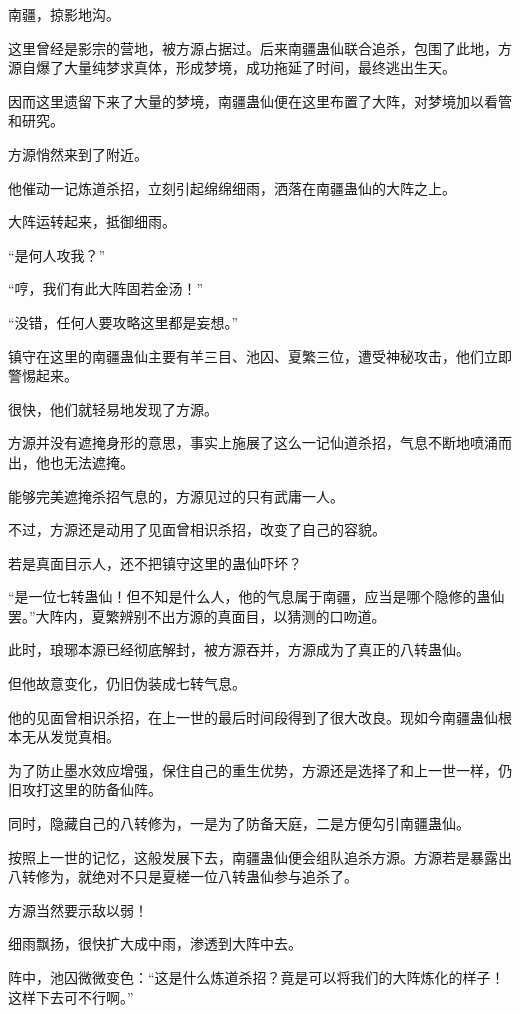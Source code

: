 \begin{this_body}
南疆，掠影地沟。

这里曾经是影宗的营地，被方源占据过。后来南疆蛊仙联合追杀，包围了此地，方源自爆了大量纯梦求真体，形成梦境，成功拖延了时间，最终逃出生天。

因而这里遗留下来了大量的梦境，南疆蛊仙便在这里布置了大阵，对梦境加以看管和研究。

方源悄然来到了附近。

他催动一记炼道杀招，立刻引起绵绵细雨，洒落在南疆蛊仙的大阵之上。

大阵运转起来，抵御细雨。

“是何人攻我？”

“哼，我们有此大阵固若金汤！”

“没错，任何人要攻略这里都是妄想。”

镇守在这里的南疆蛊仙主要有羊三目、池囚、夏繁三位，遭受神秘攻击，他们立即警惕起来。

很快，他们就轻易地发现了方源。

方源并没有遮掩身形的意思，事实上施展了这么一记仙道杀招，气息不断地喷涌而出，他也无法遮掩。

能够完美遮掩杀招气息的，方源见过的只有武庸一人。

不过，方源还是动用了见面曾相识杀招，改变了自己的容貌。

若是真面目示人，还不把镇守这里的蛊仙吓坏？

“是一位七转蛊仙！但不知是什么人，他的气息属于南疆，应当是哪个隐修的蛊仙罢。”大阵内，夏繁辨别不出方源的真面目，以猜测的口吻道。

此时，琅琊本源已经彻底解封，被方源吞并，方源成为了真正的八转蛊仙。

但他故意变化，仍旧伪装成七转气息。

他的见面曾相识杀招，在上一世的最后时间段得到了很大改良。现如今南疆蛊仙根本无从发觉真相。

为了防止墨水效应增强，保住自己的重生优势，方源还是选择了和上一世一样，仍旧攻打这里的防备仙阵。

同时，隐藏自己的八转修为，一是为了防备天庭，二是方便勾引南疆蛊仙。

按照上一世的记忆，这般发展下去，南疆蛊仙便会组队追杀方源。方源若是暴露出八转修为，就绝对不只是夏槎一位八转蛊仙参与追杀了。

方源当然要示敌以弱！

细雨飘扬，很快扩大成中雨，渗透到大阵中去。

阵中，池囚微微变色：“这是什么炼道杀招？竟是可以将我们的大阵炼化的样子！这样下去可不行啊。”


\end{this_body}
